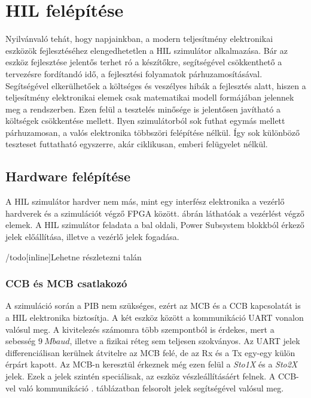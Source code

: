 \chapter{HIL felépítése}

Nyilvánvaló tehát, hogy napjainkban, a modern teljesítmény elektronikai eszközök fejlesztéséhez elengedhetetlen a HIL szimulátor alkalmazása. Bár az eszköz fejlesztése jelentős terhet ró a készítőkre, segítségével csökkenthető a tervezésre fordítandó idő, a fejlesztési folyamatok párhuzamosításával. Segítségével elkerülhetőek a költséges és veszélyes hibák a fejlesztés alatt, hiszen a teljesítmény elektronikai elemek csak matematikai modell formájában jelennek meg a rendszerben. Ezen felül a tesztelés minősége is jelentősen javítható a költségek csökkentése mellett. Ilyen szimulátorból sok futhat egymás mellett párhuzamosan, a valós elektronika többszöri felépítése nélkül. Így sok különböző teszteset futtatható egyszerre, akár ciklikusan, emberi felügyelet nélkül. \cite{sutozoli}\cite{low_cost_rt_hil}\cite{hw_emu}

\section{Hardware felépítése}

A HIL szimulátor hardver nem más, mint egy interfész elektronika a vezérlő hardverek és a szimulációt végző FPGA között.  ábrán láthatóak a vezérlést végző elemek. A HIL szimulátor feladata a bal oldali, Power Subsystem blokkból érkező jelek előállítása, illetve a vezérlő jelek fogadása.

/todo[inline]{Lehetne részletezni talán}

\subsection{CCB és MCB csatlakozó}
A szimuláció során a PIB nem szükséges, ezért az MCB és a CCB kapcsolatát is a HIL elektronika biztosítja. A két eszköz között a kommunikáció UART vonalon valósul meg. A kivitelezés számomra több szempontból is érdekes, mert a sebesség $9\ Mbaud$, illetve a fizikai réteg sem teljesen szokványos. Az UART jelek differenciálisan kerülnek átvitelre az MCB felé, de az Rx és a Tx egy-egy külön érpárt kapott. Az MCB-n keresztül érkeznek még ezen felül a \emph{Sto1X} és a \emph{Sto2X} jelek. Ezek a jelek szintén speciálisak, az eszköz vészleállításáért felnek. A CCB-vel való kommunikáció . táblázatban felsorolt jelek segítségével valósul meg. 

